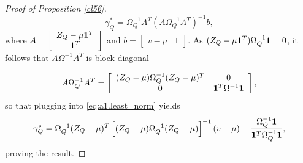 \begin{proof}[Proof of Proposition \ref{cl56}]
\begin{equation}\label{eq:a1.least_norm}
 \gamma_Q^* = \Omega^{-1}_Q A^T (A\Omega^{-1}_QA^T)^{-1} b,
\end{equation}
where $A = \left[ \begin{array}{c} Z_Q - \mu {\bf 1}^T\\ {\bf 1}^T \end{array}\right]$ and $b = \left[\begin{array}{c} v - \mu & 1 \end{array}\right]$. As $(Z_{Q} - \mu{\bf 1}^T)\Omega_Q^{-1} {\bf 1} = 0$, it follows that $A\Omega^{-1}A^T$ is block diagonal

\[ A\Omega_Q^{-1}A^T = \left[\begin{array}{cc} (Z_Q - \mu)\Omega_Q^{-1} (Z_Q- \mu)^T & 0  \\ 0 & {\bf 1}^T \Omega^{-1}{\bf 1}\end{array}\right], \]
so that plugging into \eqref{eq:a1.least_norm} yields
 \begin{equation*}
 \gamma^*_{Q} = \Omega_{Q}^{-1} (Z_{Q} - \mu)^T\left[ (Z_Q - \mu) \Omega_{Q}^{-1} (Z_Q - \mu)\right]^{-1} (v - \mu) + \frac{\Omega^{-1}_Q {\bf 1} }{{\bf 1}^T \Omega^{-1}_Q {\bf 1}},
 \end{equation*}
proving the result.






\end{proof}
